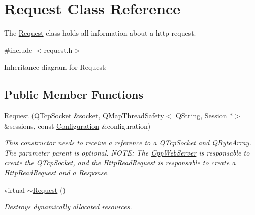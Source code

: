 \hypertarget{class_request}{}\section{Request Class Reference}
\label{class_request}


The \hyperlink{class_request}{Request} class holds all information about a http request.  




{\ttfamily \#include $<$request.\+h$>$}



Inheritance diagram for Request\+:
\subsection*{Public Member Functions}
\begin{DoxyCompactItemize}
\item 
\mbox{\label{class_request_a5dbe3045d76139502b0c0db5c67ea900}} 
\hyperlink{class_request_a5dbe3045d76139502b0c0db5c67ea900}{Request} (Q\+Tcp\+Socket \&socket, \hyperlink{class_q_map_thread_safety}{Q\+Map\+Thread\+Safety}$<$ Q\+String, \hyperlink{class_session}{Session} $\ast$$>$ \&sessions, const \hyperlink{class_configuration}{Configuration} \&configuration)
\begin{DoxyCompactList}\small\item\em This constructor needs to receive a reference to a Q\+Tcp\+Socket and Q\+Byte\+Array. The parameter parent is optional. N\+O\+TE\+: The \hyperlink{class_cpp_web_server}{Cpp\+Web\+Server} is responsable to create the Q\+Tcp\+Socket, and the \hyperlink{class_http_read_request}{Http\+Read\+Request} is responsable to create a \hyperlink{class_http_read_request}{Http\+Read\+Request} and a \hyperlink{class_response}{Response}. \end{DoxyCompactList}\item 
\mbox{\label{class_request_a4d57c725686701f773eb3630630a7ea2}} 
virtual \hyperlink{class_request_a4d57c725686701f773eb3630630a7ea2}{$\sim$\+Request} ()
\begin{DoxyCompactList}\small\item\em Destroys dynamically allocated resources. \end{DoxyCompactList}\item 
\mbox{\label{class_request_afe81be45f2fffc0e4baf2830278b8c94}} 
$$
\end{DoxyCompactItemize}
